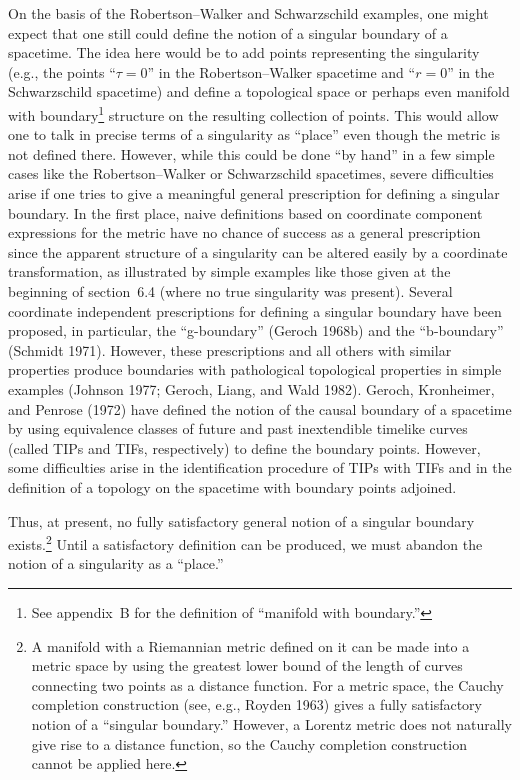 On the basis of the Robertson--Walker and Schwarzschild examples, one might
expect that one still could define the notion of a singular boundary of a spacetime.
The idea here would be to add points representing the singularity (e.g., the points
``\(\tau=0\)'' in the Robertson--Walker spacetime and ``\(r=0\)'' in the Schwarzschild
spacetime) and define a topological space or perhaps even manifold with boundary\footnote{See appendix~B for the definition of ``manifold with boundary.''}
structure on the resulting collection of points. This would allow one to talk in precise
terms of a singularity as ``place'' even though the metric is not defined there.
However, while this could be done ``by hand'' in a few simple cases like the
Robertson--Walker or Schwarzschild spacetimes, severe difficulties arise if one tries
to give a meaningful general prescription for defining a singular boundary. In the first
place, naive definitions based on coordinate component expressions for the metric
have no chance of success as a general prescription since the apparent structure of
a singularity can be altered easily by a coordinate transformation, as illustrated by
simple examples like those given at the beginning of section~6.4 (where no true
singularity was present). Several coordinate independent prescriptions for defining
a singular boundary have been proposed, in particular, the ``g-boundary'' (Geroch
1968b) and the ``b-boundary'' (Schmidt 1971). However, these prescriptions and all
others with similar properties produce boundaries with pathological topological
properties in simple examples (Johnson 1977; Geroch, Liang, and Wald 1982).
Geroch, Kronheimer, and Penrose (1972) have defined the notion of the causal
boundary of a spacetime by using equivalence classes of future and past inextendible
timelike curves (called TIPs and TIFs, respectively) to define the boundary points.
However, some difficulties arise in the identification procedure of TIPs with TIFs
and in the definition of a topology on the spacetime with boundary points adjoined.

Thus, at present, no fully satisfactory general notion of a singular boundary exists.\footnote{A manifold with a Riemannian metric defined on it can be made into a metric space by using the
greatest lower bound of the length of curves connecting two points as a distance function. For a metric
space, the Cauchy completion construction (see, e.g., Royden 1963) gives a fully satisfactory notion of
a ``singular boundary.'' However, a Lorentz metric does not naturally give rise to a distance function,
so the Cauchy completion construction cannot be applied here.}
Until a satisfactory definition can be produced, we must abandon the notion of a
singularity as a ``place.''


